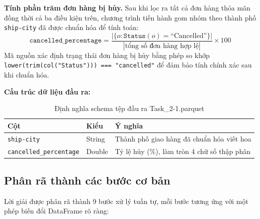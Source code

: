 \textbf{Tính phần trăm đơn hàng bị hủy.}
Sau khi lọc ra tất cả đơn hàng thỏa mãn đồng thời cả ba điều kiện trên, chương trình tiến hành gom nhóm theo thành phố \texttt{ship-city} đã được chuẩn hóa để tính toán:
\[
\texttt{cancelled\_percentage} = \frac{|\{o : \texttt{Status}(o) = \text{``Cancelled''}\}|}{|\text{tổng số đơn hàng hợp lệ}|} \times 100
\]
Mã nguồn xác định trạng thái đơn hàng bị hủy bằng phép so khớp \texttt{lower(trim(col("Status"))) === "cancelled"} để đảm bảo tính chính xác sau khi chuẩn hóa.

\textbf{Cấu trúc dữ liệu đầu ra:}
\begin{table}[H]
\centering
\begin{tabular}{lll}
\toprule
\textbf{Cột} & \textbf{Kiểu} & \textbf{Ý nghĩa} \\
\midrule
\texttt{ship-city}  & String & Thành phố giao hàng đã chuẩn hóa viết hoa \\
\texttt{cancelled\_percentage} & Double & Tỷ lệ hủy (\%), làm tròn 4 chữ số thập phân \\
\bottomrule
\end{tabular}
\caption{Định nghĩa schema tệp đầu ra Task\_2-1.parquet}
\label{tab:task2_1_schema}
\end{table}

\subsection{Phân rã thành các bước cơ bản}

Lời giải được phân rã thành 9 bước xử lý tuần tự, mỗi bước tương ứng với một phép biến đổi DataFrame rõ ràng:

